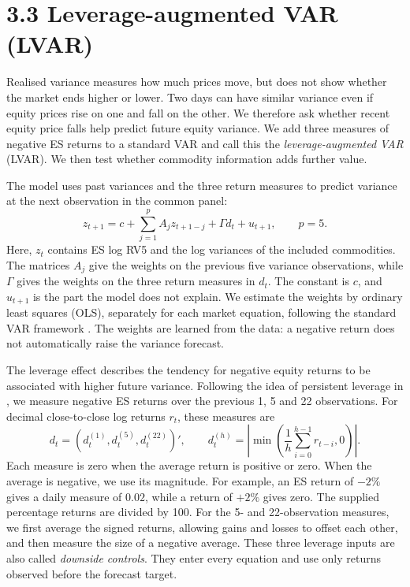 \documentclass[11pt,a4paper]{article}
\begin{document}
\section*{3.3 Leverage-augmented VAR (LVAR)}

Realised variance measures how much prices move, but does not show whether the market ends higher or lower. Two days can have similar variance even if equity prices rise on one and fall on the other. We therefore ask whether recent equity price falls help predict future equity variance. We add three measures of negative ES returns to a standard VAR and call this the \emph{leverage-augmented VAR} (LVAR). We then test whether commodity information adds further value.

The model uses past variances and the three return measures to predict variance at the next observation in the common panel:
\begin{equation}\label{eq:jake-lvar}
 z_{t+1}=c+\sum_{j=1}^{p} A_jz_{t+1-j}+\Gamma d_t+u_{t+1},
 \qquad p=5.
\end{equation}
Here, $z_t$ contains ES log RV5 and the log variances of the included commodities. The matrices $A_j$ give the weights on the previous five variance observations, while $\Gamma$ gives the weights on the three return measures in $d_t$. The constant is $c$, and $u_{t+1}$ is the part the model does not explain. We estimate the weights by ordinary least squares (OLS), separately for each market equation, following the standard VAR framework \citep{lutkepohl}. The weights are learned from the data: a negative return does not automatically raise the variance forecast.

The leverage effect describes the tendency for negative equity returns to be associated with higher future variance. Following the idea of persistent leverage in \citet{corsi-reno}, we measure negative ES returns over the previous 1, 5 and 22 observations. For decimal close-to-close log returns $r_t$, these measures are
\begin{equation}\label{eq:jake-downside}
 d_t=(d_t^{(1)},d_t^{(5)},d_t^{(22)})',\qquad
 d_t^{(h)}=\left|\min\left(\frac{1}{h}\sum_{i=0}^{h-1}r_{t-i},0\right)\right|.
\end{equation}
Each measure is zero when the average return is positive or zero. When the average is negative, we use its magnitude. For example, an ES return of $-2\%$ gives a daily measure of $0.02$, while a return of $+2\%$ gives zero. The supplied percentage returns are divided by 100. For the 5- and 22-observation measures, we first average the signed returns, allowing gains and losses to offset each other, and then measure the size of a negative average. These three leverage inputs are also called \emph{downside controls}. They enter every equation and use only returns observed before the forecast target.
\end{document}
